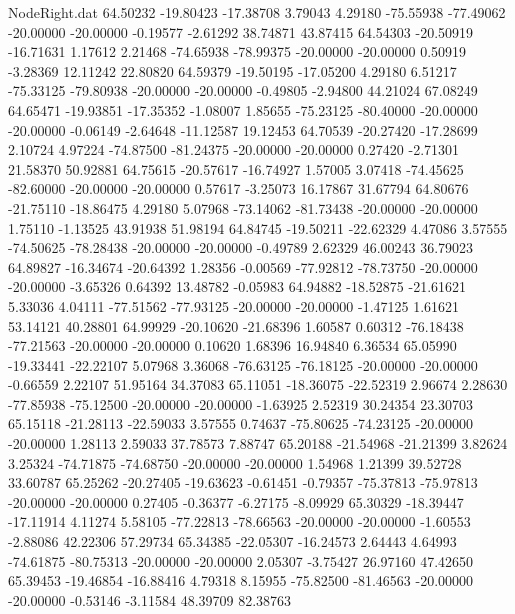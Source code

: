 \begin{filecontents}{NodeRight.dat}
  64.50232  -19.80423  -17.38708     3.79043    4.29180  -75.55938  -77.49062  -20.00000  -20.00000   -0.19577   -2.61292   38.74871   43.87415
  64.54303  -20.50919  -16.71631     1.17612    2.21468  -74.65938  -78.99375  -20.00000  -20.00000    0.50919   -3.28369   12.11242   22.80820
  64.59379  -19.50195  -17.05200     4.29180    6.51217  -75.33125  -79.80938  -20.00000  -20.00000   -0.49805   -2.94800   44.21024   67.08249
  64.65471  -19.93851  -17.35352    -1.08007    1.85655  -75.23125  -80.40000  -20.00000  -20.00000   -0.06149   -2.64648  -11.12587   19.12453
  64.70539  -20.27420  -17.28699     2.10724    4.97224  -74.87500  -81.24375  -20.00000  -20.00000    0.27420   -2.71301   21.58370   50.92881
  64.75615  -20.57617  -16.74927     1.57005    3.07418  -74.45625  -82.60000  -20.00000  -20.00000    0.57617   -3.25073   16.17867   31.67794
  64.80676  -21.75110  -18.86475     4.29180    5.07968  -73.14062  -81.73438  -20.00000  -20.00000    1.75110   -1.13525   43.91938   51.98194
  64.84745  -19.50211  -22.62329     4.47086    3.57555  -74.50625  -78.28438  -20.00000  -20.00000   -0.49789    2.62329   46.00243   36.79023
  64.89827  -16.34674  -20.64392     1.28356   -0.00569  -77.92812  -78.73750  -20.00000  -20.00000   -3.65326    0.64392   13.48782   -0.05983
  64.94882  -18.52875  -21.61621     5.33036    4.04111  -77.51562  -77.93125  -20.00000  -20.00000   -1.47125    1.61621   53.14121   40.28801
  64.99929  -20.10620  -21.68396     1.60587    0.60312  -76.18438  -77.21563  -20.00000  -20.00000    0.10620    1.68396   16.94840    6.36534
  65.05990  -19.33441  -22.22107     5.07968    3.36068  -76.63125  -76.18125  -20.00000  -20.00000   -0.66559    2.22107   51.95164   34.37083
  65.11051  -18.36075  -22.52319     2.96674    2.28630  -77.85938  -75.12500  -20.00000  -20.00000   -1.63925    2.52319   30.24354   23.30703
  65.15118  -21.28113  -22.59033     3.57555    0.74637  -75.80625  -74.23125  -20.00000  -20.00000    1.28113    2.59033   37.78573    7.88747
  65.20188  -21.54968  -21.21399     3.82624    3.25324  -74.71875  -74.68750  -20.00000  -20.00000    1.54968    1.21399   39.52728   33.60787
  65.25262  -20.27405  -19.63623    -0.61451   -0.79357  -75.37813  -75.97813  -20.00000  -20.00000    0.27405   -0.36377   -6.27175   -8.09929
  65.30329  -18.39447  -17.11914     4.11274    5.58105  -77.22813  -78.66563  -20.00000  -20.00000   -1.60553   -2.88086   42.22306   57.29734
  65.34385  -22.05307  -16.24573     2.64443    4.64993  -74.61875  -80.75313  -20.00000  -20.00000    2.05307   -3.75427   26.97160   47.42650
  65.39453  -19.46854  -16.88416     4.79318    8.15955  -75.82500  -81.46563  -20.00000  -20.00000   -0.53146   -3.11584   48.39709   82.38763

\end{filecontents}
